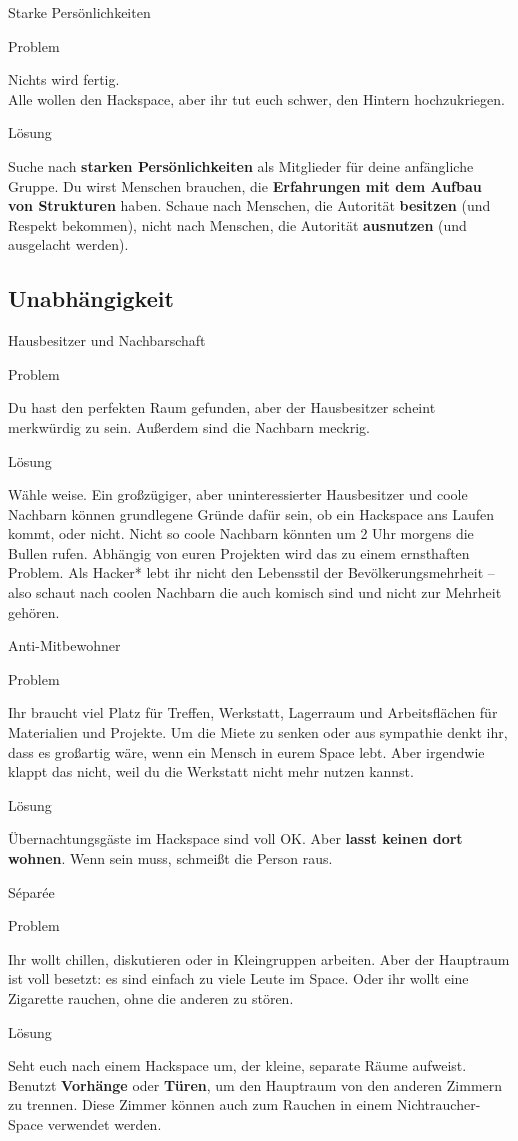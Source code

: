 \documentclass[aspectratio=1610]{beamer}
\newcommand{\pattern}[2]{
  \begin{alertblock}{Problem}
    #1
  \end{alertblock}
  \pause
  \begin{exampleblock}{Lösung}
    #2
  \end{exampleblock}
}
\begin{document}
  \begin{frame}{Starke Persönlichkeiten}
    \pattern{
      Nichts wird fertig.\\
      Alle wollen den Hackspace, aber ihr tut euch schwer, den Hintern hochzukriegen.
    }{
      Suche nach \textbf{starken Persönlichkeiten} als Mitglieder für deine
      anfängliche Gruppe. Du wirst Menschen brauchen, die \textbf{Erfahrungen
      mit dem Aufbau von Strukturen} haben. Schaue nach Menschen, die
      Autorität \textbf{besitzen} (und Respekt bekommen), nicht nach Menschen,
      die Autorität \textbf{ausnutzen} (und ausgelacht werden).
    }
  \end{frame}

  \subsection{Unabhängigkeit}

  \begin{frame}{Hausbesitzer und Nachbarschaft}
    \pattern{
      Du hast den perfekten Raum gefunden, aber der Hausbesitzer scheint
      merkwürdig zu sein. Außerdem sind die Nachbarn meckrig.
    }{
      Wähle weise. Ein großzügiger, aber uninteressierter Hausbesitzer und coole
      Nachbarn können grundlegene Gründe dafür sein, ob ein Hackspace ans
      Laufen kommt, oder nicht. Nicht so coole Nachbarn könnten um 2 Uhr morgens
      die Bullen rufen. Abhängig von euren Projekten wird das zu einem
      ernsthaften Problem. Als Hacker* lebt ihr nicht den Lebensstil der
      Bevölkerungsmehrheit – also schaut nach coolen Nachbarn die auch komisch
      sind und nicht zur Mehrheit gehören.
    }
  \end{frame}

  \begin{frame}{Anti-Mitbewohner}
    \pattern{
      Ihr braucht viel Platz für Treffen, Werkstatt, Lagerraum und
      Arbeitsflächen für Materialien und Projekte. Um die Miete zu senken oder
      aus sympathie denkt ihr, dass es großartig wäre, wenn ein Mensch in eurem
      Space lebt. Aber irgendwie klappt das nicht, weil du die Werkstatt nicht
      mehr nutzen kannst.
    }{
      Übernachtungsgäste im Hackspace sind voll OK. Aber \textbf{lasst keinen
      dort wohnen}. Wenn sein muss, schmeißt die Person raus.
    }
  \end{frame}

  \begin{frame}{Séparée}
    \pattern{
      Ihr wollt chillen, diskutieren oder in Kleingruppen arbeiten. Aber der
      Hauptraum ist voll besetzt: es sind einfach zu viele Leute im Space. Oder
      ihr wollt eine Zigarette rauchen, ohne die anderen zu stören.
    }{
      Seht euch nach einem Hackspace um, der kleine, separate Räume aufweist.
      Benutzt \textbf{Vorhänge} oder \textbf{Türen}, um den Hauptraum von den
      anderen Zimmern zu trennen. Diese Zimmer können auch zum Rauchen in einem
      Nichtraucher-Space verwendet werden.
    }
  \end{frame}
\end{document}
